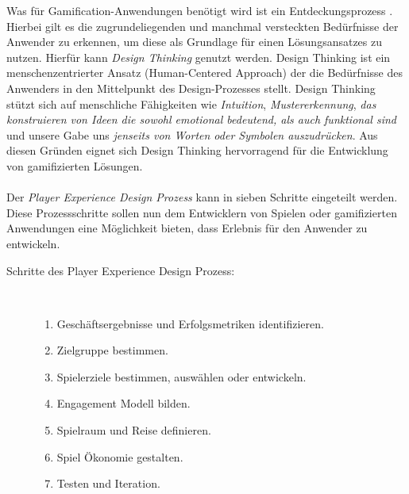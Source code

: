 \documentclass[a4paper,12pt,twoside]{scrartcl}
\begin{document}
Was für Gamification-Anwendungen benötigt wird ist ein Entdeckungsprozess \cite{gamificationDefinition}. Hierbei gilt es die zugrundeliegenden und manchmal versteckten Bedürfnisse der Anwender zu erkennen, um diese als Grundlage für einen Lösungsansatzes zu nutzen. Hierfür kann \textit{Design Thinking} genutzt werden. Design Thinking ist ein menschenzentrierter Ansatz (Human-Centered Approach) der die Bedürfnisse des Anwenders in den Mittelpunkt des Design-Prozesses stellt. Design Thinking stützt sich auf menschliche Fähigkeiten wie \textit{Intuition}, \textit{Mustererkennung}, \textit{das konstruieren von Ideen die sowohl emotional bedeutend, als auch funktional sind} und unsere Gabe uns \textit{jenseits von Worten oder Symbolen auszudrücken}. Aus diesen Gründen eignet sich Design Thinking hervorragend für die Entwicklung von gamifizierten Lösungen.
\\\\
Der \textit{Player Experience Design Prozess} kann in sieben Schritte eingeteilt werden. Diese Prozessschritte sollen nun dem Entwicklern von Spielen oder gamifizierten Anwendungen eine Möglichkeit bieten, dass Erlebnis für den Anwender zu entwickeln.
\begin{description}
   \item[Schritte des Player Experience Design Prozess:]~\par
   \begin{enumerate}
      \item Geschäftsergebnisse und Erfolgsmetriken identifizieren.
      \item Zielgruppe bestimmen.
      \item Spielerziele bestimmen, auswählen oder entwickeln.
      \item Engagement Modell bilden.
      \item Spielraum und Reise definieren.
      \item Spiel Ökonomie gestalten.
      \item Testen und Iteration.
   \end{enumerate}
\end{description}
\end{document}
